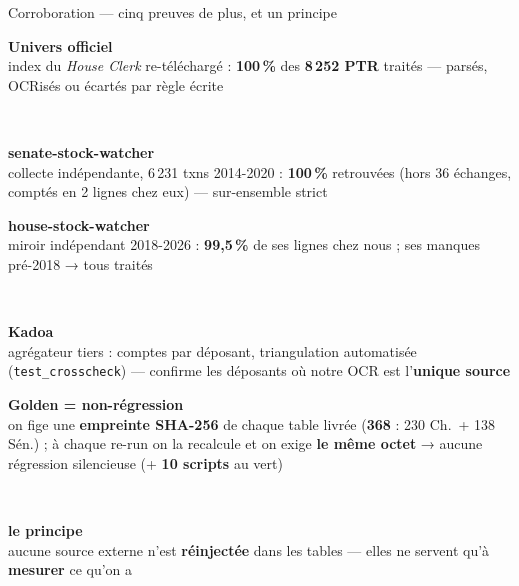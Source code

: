 \documentclass[11pt,aspectratio=169]{beamer}
\newcommand{\co}[1]{\texttt{#1}}
\newcommand{\carte}[3]{%
  \colorbox{#1!10}{\parbox[t][23mm][t]{\dimexpr\linewidth-8pt}{\vspace{1mm}
    {\color{#1}\footnotesize\textbf{#2}}\\[0.8mm]{\scriptsize #3}}}}
\begin{document}
\begin{frame}{Corroboration --- cinq preuves de plus, et un principe}
  \centering
  \begin{minipage}[t]{0.32\textwidth}
    \carte{helec}{Univers officiel}{index du \emph{House Clerk} re-téléchargé :
      \textbf{100\,\%} des \textbf{8\,252 PTR} traités — parsés, OCRisés ou écartés
      par règle écrite}\\[2mm]
    \carte{okgreen}{senate-stock-watcher}{collecte indépendante, 6\,231 txns 2014-2020 :
      \textbf{100\,\%} retrouvées (hors 36 échanges, comptés
      en 2 lignes chez eux) — sur-ensemble strict}
  \end{minipage}\hfill
  \begin{minipage}[t]{0.32\textwidth}
    \carte{selec}{house-stock-watcher}{miroir indépendant 2018-2026 :
      \textbf{99,5\,\%} de ses lignes chez nous ; ses manques pré-2018 → tous traités}\\[2mm]
    \carte{warnorange}{Kadoa}{agrégateur tiers : comptes par déposant, triangulation
      automatisée (\co{test\_crosscheck}) — confirme les déposants où notre OCR
      est l'\textbf{unique source}}
  \end{minipage}\hfill
  \begin{minipage}[t]{0.32\textwidth}
    \carte{alertred}{Golden = non-régression}{on fige une \textbf{empreinte SHA-256} de chaque table livrée (\textbf{368} : 230 Ch.\ + 138 Sén.) ; à chaque re-run on la recalcule et on exige \textbf{le même octet} → aucune régression silencieuse (+ \textbf{10 scripts} au vert)}\\[2mm]
    \colorbox{black!6}{\parbox[t][23mm][t]{\dimexpr\linewidth-8pt}{\vspace{1mm}
      {\footnotesize\textbf{le principe}}\\[0.8mm]{\scriptsize aucune source externe
      n'est \textbf{réinjectée} dans les tables — elles ne servent qu'à
      \textbf{mesurer} ce qu'on a}}}
  \end{minipage}
\end{frame}
\end{document}
